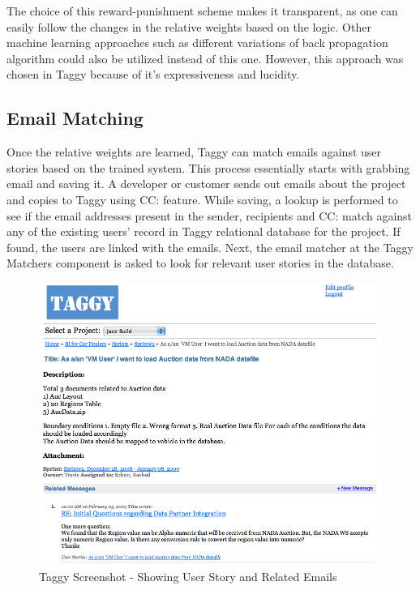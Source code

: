 The choice of this reward-punishment scheme makes it transparent, as one can easily follow the changes in the relative weights based on the logic. Other machine learning approaches such as different variations of back propagation algorithm could also be utilized instead of this one. However, this approach was chosen in Taggy because of it's expressiveness and lucidity.

\subsection{Email Matching}
Once the relative weights are learned, Taggy can match emails against user stories based on the trained system. This process essentially starts with grabbing email and saving it. A developer or customer sends out emails about the project and copies to Taggy using CC: feature. While saving, a lookup is performed to see if the email addresses present in the sender, recipients and CC: match against any of the existing users' record in Taggy relational database for the project. If found, the users are linked with the emails. Next, the email matcher at the Taggy Matchers component is asked to look for relevant user stories in the database.

\begin{figure}[tb]
	\centering
	\includegraphics[width=\textwidth]{taggy_user_story.png}
    \caption{Taggy Screenshot - Showing User Story and Related Emails}
	\label{fig:taggy_user_story}
\end{figure}

